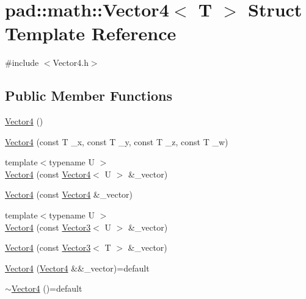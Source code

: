 \hypertarget{structpad_1_1math_1_1_vector4}{}\section{pad\+:\+:math\+:\+:Vector4$<$ T $>$ Struct Template Reference}
\label{structpad_1_1math_1_1_vector4}


{\ttfamily \#include $<$Vector4.\+h$>$}

\subsection*{Public Member Functions}
\begin{DoxyCompactItemize}
\item 
\mbox{\hyperlink{structpad_1_1math_1_1_vector4_a685f645bb73f9e7e2f0cfad10f8c9b3b}{Vector4}} ()
\item 
\mbox{\hyperlink{structpad_1_1math_1_1_vector4_a9ba6589a62f7635c2255c52c7b818aec}{Vector4}} (const T \+\_\+x, const T \+\_\+y, const T \+\_\+z, const T \+\_\+w)
\item 
{\footnotesize template$<$typename U $>$ }\\\mbox{\hyperlink{structpad_1_1math_1_1_vector4_a75987918337a3705cae46e39f4362433}{Vector4}} (const \mbox{\hyperlink{structpad_1_1math_1_1_vector4}{Vector4}}$<$ U $>$ \&\+\_\+vector)
\item 
\mbox{\hyperlink{structpad_1_1math_1_1_vector4_a44585061b6980544187b6309a3371061}{Vector4}} (const \mbox{\hyperlink{structpad_1_1math_1_1_vector4}{Vector4}} \&\+\_\+vector)
\item 
{\footnotesize template$<$typename U $>$ }\\\mbox{\hyperlink{structpad_1_1math_1_1_vector4_a8eff662101e960939085ce8033f9ddae}{Vector4}} (const \mbox{\hyperlink{structpad_1_1math_1_1_vector3}{Vector3}}$<$ U $>$ \&\+\_\+vector)
\item 
\mbox{\hyperlink{structpad_1_1math_1_1_vector4_ab0f618c20e7b108864b231e9ff63a2ba}{Vector4}} (const \mbox{\hyperlink{structpad_1_1math_1_1_vector3}{Vector3}}$<$ T $>$ \&\+\_\+vector)
\item 
\mbox{\hyperlink{structpad_1_1math_1_1_vector4_acc4699e8164a36ac16bac91357f8e7cd}{Vector4}} (\mbox{\hyperlink{structpad_1_1math_1_1_vector4}{Vector4}} \&\&\+\_\+vector)=default
\item 
\mbox{\hyperlink{structpad_1_1math_1_1_vector4_adf02f843943a3524de2add168b4d4903}{$\sim$\+Vector4}} ()=default
\item 

\end{DoxyCompactItemize}
